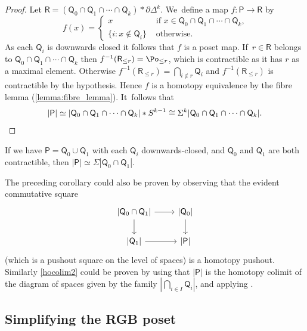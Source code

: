 \begin{proof}
Let $\mathsf{R}=(\mathsf Q_0 \cap \mathsf Q_1\cap \cdots \cap \mathsf Q_k) \ast \partial \mathsf \Delta^{k}$. We~define a map
$ f\colon \mathsf P \to \mathsf{R}$ by
\[
f(x)= \begin{cases} x & \text{ if $x\in \mathsf Q_0 \cap \mathsf Q_1\cap \cdots \cap \mathsf Q_k$,}\\
\{ i : x \not\in \mathsf Q_i \} & \text{ otherwise. } \end{cases}
\]
As each $\mathsf Q_i$ is downwards closed it follows that $f$ is a poset map. If~$r \in \mathsf R$ belongs to $\mathsf Q_0\cap \mathsf Q_1 \cap \cdots \cap \mathsf Q_k$ then $f^{-1}(\mathsf R_{\leq r})=\Po_{\leq r}$, which is contractible as it has $r$ as a maximal element. Otherwise $f^{-1}(\mathsf R_{\leq r})=\bigcap_{i \not\in r} \mathsf Q_i$ and $f^{-1}(\mathsf R_{\leq r})$ is contractible by the hypothesis. Hence $f$ is a homotopy equivalence by the fibre lemma (\ref{lemma:fibre_lemma}). It~follows that
\[
|\mathsf P| \simeq |\mathsf Q_0 \cap \mathsf Q_1\cap \cdots \cap \mathsf Q_k| \ast S^{k-1} \cong \Sigma^{k}|\mathsf Q_0 \cap \mathsf Q_1\cap \cdots \cap \mathsf Q_k|. \qedhere
\]
\end{proof}

\begin{cor}\label{hocolim1}If we have $\mathsf P = \mathsf Q_0 \cup \mathsf Q_1$ with each $\mathsf Q_i$ downwards-closed, and $\mathsf Q_0$ and $\mathsf Q_1$ are both contractible, then $|\mathsf P| \simeq \Sigma |\mathsf Q_0 \cap \mathsf Q_1|.$
\end{cor}

\begin{rem}
The preceding corollary could also be proven by observing that the evident commutative square
\[
\begin{tikzcd}
\vert\mathsf Q_0 \cap \mathsf Q_1\vert \arrow[r]\arrow[d]& \vert\mathsf Q_0 \vert\arrow[d] \\
\vert\mathsf Q_1\vert \arrow[r]& \vert\mathsf P\vert
\end{tikzcd}
\]
(which is a pushout square on the level of spaces) is a homotopy pushout. Similarly \cref{hocolim2} could be proven by using that $|\mathsf P|$ is the homotopy colimit of the diagram of spaces given by the family $|\bigcap_{i \in I}\mathsf Q_i |$, and applying \cite[Ex.\,5.7.5]{munson-volic}.\end{rem}

\subsection{Simplifying the RGB poset}

